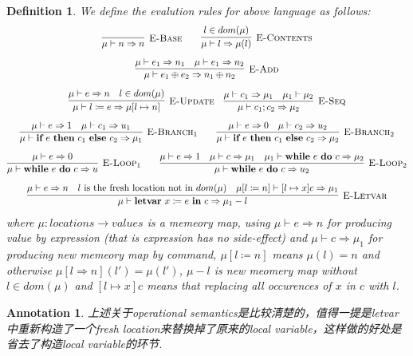 \documentclass{article}
\newtheorem{definition}[theorem]{Definition}
\newtheorem{annotation}[theorem]{Annotation}
\newcommand*{\xfunc}[4]{{#2}\colon{#3}{#1}{#4}}
\newcommand*{\func}[3]{\xfunc{\to}{#1}{#2}{#3}}
\newcommand{\ifelse}[3]{\ensuremath{\textbf{if}~#1~\textbf{then}~#2~\textbf{else}~#3}}
\newcommand{\newwhiledo}[2]{\ensuremath{\textbf{while}~#1~\textbf{do}~#2}}
\newcommand{\letvar}[2]{\ensuremath{\textbf{letvar}~#1~\textbf{in}~#2}}
\begin{document}
\begin{definition}
\rm We define the evalution rules for above language as follows:
\[
	\begin{gathered}
	\infer[\textsc{E-Base}]{\mu \vdash n \Rightarrow n}{} \quad\quad \infer[\textsc{E-Contents}]{\mu \vdash l \Rightarrow \mu(l)}{l \in dom(\mu)} \\[0.5em]
	\infer[\textsc{E-Add}]{\mu \vdash e_1 \oplus e_2 \Rightarrow n_1 \oplus n_2}{\mu \vdash e_1 \Rightarrow n_1 & \mu \vdash e_1 \Rightarrow n_2} \\[0.5em]
	\infer[\textsc{E-Update}]{\mu \vdash l \coloneqq e \Rightarrow \mu[l \mapsto n]}{\mu \vdash e \Rightarrow n & l \in dom(\mu)} \quad \infer[\textsc{E-Seq}]{\mu \vdash c_1;c_2 \Rightarrow \mu_2}{\mu \vdash c_1 \Rightarrow \mu_1 & \mu_1 \vdash \mu_2} \\[0.5em]
	\infer[\textsc{E-Branch}_1]{\mu \vdash \ifelse{e}{c_1}{c_2} \Rightarrow \mu_1}{\mu \vdash e \Rightarrow 1 & \mu \vdash c_1 \Rightarrow u_1} \quad\quad \infer[\textsc{E-Branch}_2]{\mu \vdash \ifelse{e}{c_1}{c_2} \Rightarrow \mu_2}{\mu \vdash e \Rightarrow 0 & \mu \vdash c_2 \Rightarrow u_2} \\[0.5em]
	\infer[\textsc{E-Loop}_1]{\mu \vdash \newwhiledo{e}{c} \Rightarrow u}{\mu \vdash e \Rightarrow 0} \quad\quad \infer[\textsc{E-Loop}_2]{\mu \vdash \newwhiledo{e}{c} \Rightarrow u_2}{\mu \vdash e \Rightarrow 1 & \mu \vdash c \Rightarrow \mu_1 & \mu_1 \vdash \newwhiledo{e}{c} \Rightarrow \mu_2}\\[0.5em]
	\infer[\textsc{E-Letvar}]{\mu \vdash \letvar{x \coloneqq e}{c} \Rightarrow \mu_1-l}{\mu \vdash e \Rightarrow n & \text{$l$ is the fresh location not in $dom(\mu)$} & \mu[l \coloneqq n] \vdash [l \mapsto x]c \Rightarrow \mu_1}
	\end{gathered}
\]
where $\func{\mu}{locations}{values}$ is a memeory map, using $\mu \vdash e \Rightarrow n$ for producing value by expression (that is expression has no side-effect) and $\mu \vdash c \Rightarrow \mu_1$ for producing new memeory map by command, $\mu[l \coloneqq n]$ means $\mu(l) = n$ and otherwise $\mu[l \Rightarrow n](l') = \mu(l')$, $\mu-l$ is new meomery map without $l \in dom(\mu)$ and $[l \mapsto x]c$ means that replacing all occurences of $x$ in $c$ with $l$.
\end{definition}

\begin{annotation}
\rm 上述关于operational semantics是比较清楚的，值得一提是letvar中重新构造了一个fresh location来替换掉了原来的local variable，这样做的好处是省去了构造local variable的环节. 
\end{annotation}
\end{document}
